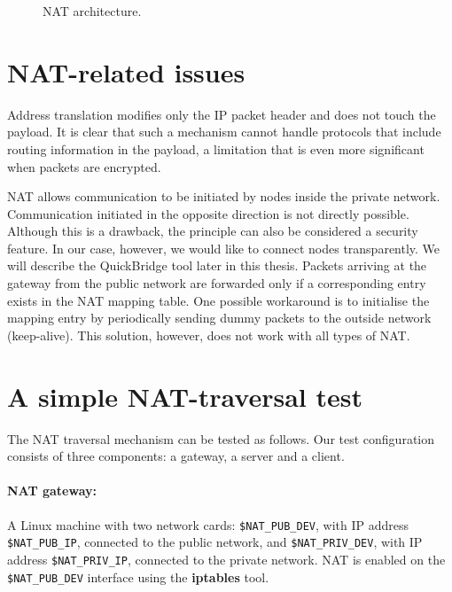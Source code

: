 \begin{figure}
\centering

\caption{NAT architecture.}
\label{fig:NatArchitecture}
\end{figure}

\section{NAT-related issues}
Address translation modifies only the IP packet header and does not touch the payload.
It is clear that such a mechanism cannot handle protocols that include routing information in the payload, a limitation that is even more significant when packets are encrypted.

NAT allows communication to be initiated by nodes inside the private network. Communication initiated in the opposite direction is not directly possible.
Although this is a drawback, the principle can also be considered a security feature.
In our case, however, we would like to connect nodes transparently. We will describe the QuickBridge tool later in this thesis.
Packets arriving at the gateway from the public network are forwarded only if a corresponding entry exists in the NAT mapping table.
One possible workaround is to initialise the mapping entry by periodically sending dummy packets to the outside network (keep-alive).
This solution, however, does not work with all types of NAT.

\section{A simple NAT-traversal test}
The NAT traversal mechanism can be tested as follows.
Our test configuration consists of three components: a gateway, a server and a client.

\paragraph*{NAT gateway:}
A Linux machine with two network cards: \verb|$NAT_PUB_DEV|, with IP address \verb|$NAT_PUB_IP|, connected to the public network, and \verb|$NAT_PRIV_DEV|, with IP address \verb|$NAT_PRIV_IP|, connected to the private network. NAT is enabled on the \verb|$NAT_PUB_DEV| interface using the \textbf{iptables} tool.

